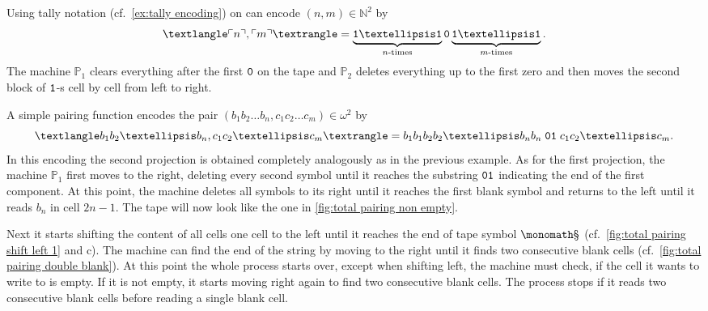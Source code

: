\begin{exam}
  \begin{exlist}
    \item\label{ex:tally pairing}
    Using tally notation (cf.~\cref{ex:tally encoding}) on can encode $(n, m) ∈
    ℕ^2$ by
    \[
      ⟨\enc{n}, \enc{m}⟩ = \underbrace{\one … \one}_{n\text{-times}} \zer \underbrace{\one … \one}_{m\text{-times}}.
    \]
    The machine \(\mathbb{P}_1\) clears everything after the first \(\mathtt{0}\) on
    the tape and \(\mathbb{P}_2\) deletes everything up to the first zero and
    then moves the second block of \(\mathtt{1}\)-s cell by cell from left to right.

    \item\label{ex:total pairing}
    A simple pairing function encodes the pair $(b_1b_2…b_n, c_1c_2…c_m) ∈ ω^2$
    by
    \[
      ⟨b_1b_2…b_n, c_1c_2…c_m⟩ = b_1b_1b_2b_2…b_nb_n \; \zer\one \; c_1c_2…c_m.
    \]
    In this encoding the second projection is obtained completely analogously as
    in the previous example. As for the first projection, the machine
    \(\mathbb{P}_1\) first moves to the right, deleting every second symbol
    until it reaches the substring \(\mathtt{0}\mathtt{1}\) indicating the end of the first
    component. At this point, the machine deletes all symbols to its right until
    it reaches the first blank symbol and returns to the left until it reads
    \(b_n\) in cell \(2n - 1\). The tape will now look like the one in
    \cref{fig:total pairing non empty}.

    Next it starts shifting the content of all cells one cell to the left until
    it reaches the end of tape symbol \(\sta\) (cf.~\cref{fig:total pairing
    shift left 1} and c). The machine can find the end of the string by moving
    to the right until it finds two consecutive blank cells (cf.~\cref{fig:total
    pairing double blank}). At this point the whole process starts over, except
    when shifting left, the machine must check, if the cell it wants to write to
    is empty. If it is not empty, it starts moving right again to find two
    consecutive blank cells. The process stops if it reads two consecutive blank
    cells before reading a single blank cell.
  \end{exlist}
\end{exam}


